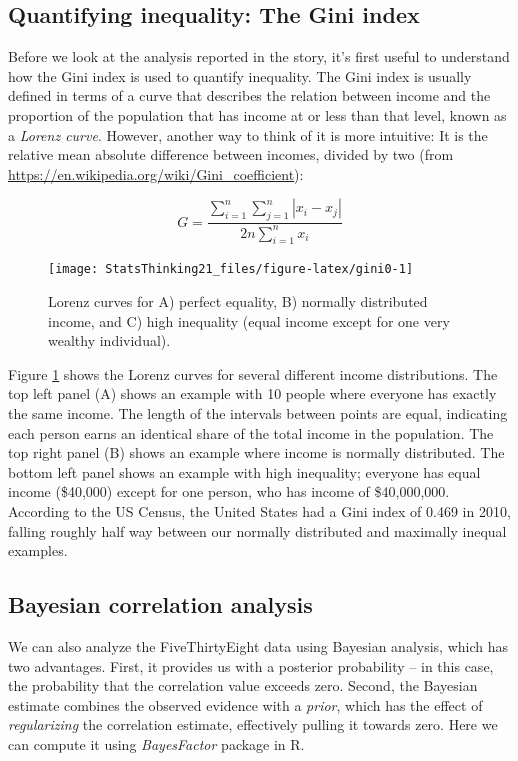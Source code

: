 \documentclass[
  12pt,
]{book}
\begin{document}
\hypertarget{quantifying-inequality-the-gini-index}{%
\subsection{Quantifying inequality: The Gini index}\label{quantifying-inequality-the-gini-index}}

Before we look at the analysis reported in the story, it's first useful to understand how the Gini index is used to quantify inequality. The Gini index is usually defined in terms of a curve that describes the relation between income and the proportion of the population that has income at or less than that level, known as a \emph{Lorenz curve}. However, another way to think of it is more intuitive: It is the relative mean absolute difference between incomes, divided by two (from \url{https://en.wikipedia.org/wiki/Gini_coefficient}):

\[
G = \frac{\displaystyle{\sum_{i=1}^n \sum_{j=1}^n \left| x_i - x_j \right|}}{\displaystyle{2n\sum_{i=1}^n x_i}} 
\]

\begin{figure}
\texttt{[image: StatsThinking21\_files/figure-latex/gini0-1]} \caption{Lorenz curves for A) perfect equality, B) normally distributed income, and C) high inequality (equal income except for one very wealthy individual).}\label{fig:gini0}
\end{figure}

Figure \ref{fig:gini0} shows the Lorenz curves for several different income distributions. The top left panel (A) shows an example with 10 people where everyone has exactly the same income. The length of the intervals between points are equal, indicating each person earns an identical share of the total income in the population. The top right panel (B) shows an example where income is normally distributed. The bottom left panel shows an example with high inequality; everyone has equal income (\$40,000) except for one person, who has income of \$40,000,000. According to the US Census, the United States had a Gini index of 0.469 in 2010, falling roughly half way between our normally distributed and maximally inequal examples.

\hypertarget{bayesian-correlation-analysis}{%
\subsection{Bayesian correlation analysis}\label{bayesian-correlation-analysis}}

We can also analyze the FiveThirtyEight data using Bayesian analysis, which has two advantages. First, it provides us with a posterior probability -- in this case, the probability that the correlation value exceeds zero. Second, the Bayesian estimate combines the observed evidence with a \emph{prior}, which has the effect of \emph{regularizing} the correlation estimate, effectively pulling it towards zero. Here we can compute it using \emph{BayesFactor} package in R.
\end{document}

